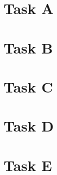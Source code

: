\documentclass[12pt,a4paper]{article}
\begin{document}
\section{Task A}


\section{Task B}


\section{Task C}


\section{Task D}


\section{Task E}

\end{document}
